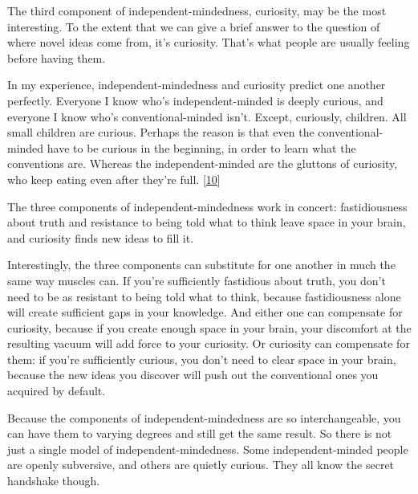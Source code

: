 The third component of
                  independent-mindedness, curiosity, may be the most
                  interesting. To the extent that we can give a brief answer to
                  the question of where novel ideas come from, it's curiosity.
                  That's what people are usually feeling before having them.

In
                  my experience, independent-mindedness and curiosity predict
                  one another perfectly. Everyone I know who's
                  independent-minded is deeply curious, and everyone I know
                  who's conventional-minded isn't. Except, curiously, children.
                  All small children are curious. Perhaps the reason is that
                  even the conventional-minded have to be curious in the
                  beginning, in order to learn what the conventions are. Whereas
                  the independent-minded are the gluttons of curiosity, who keep
                  eating even after they're full.
                  [\href{\#f10n}{10}]

The three components of independent-mindedness
                  work in concert: fastidiousness about truth and resistance to
                  being told what to think leave space in your brain, and
                  curiosity finds new ideas to fill it.

Interestingly,
                  the three components can substitute for one another in much
                  the same way muscles can. If you're sufficiently fastidious
                  about truth, you don't need to be as resistant to being told
                  what to think, because fastidiousness alone will create
                  sufficient gaps in your knowledge. And either one can
                  compensate for curiosity, because if you create enough space
                  in your brain, your discomfort at the resulting vacuum will
                  add force to your curiosity. Or curiosity can compensate for
                  them: if you're sufficiently curious, you don't need to clear
                  space in your brain, because the new ideas you discover will
                  push out the conventional ones you acquired by default.

Because
                  the components of independent-mindedness are so
                  interchangeable, you can have them to varying degrees and
                  still get the same result. So there is not just a single model
                  of independent-mindedness. Some independent-minded people are
                  openly subversive, and others are quietly curious. They all
                  know the secret handshake though.

